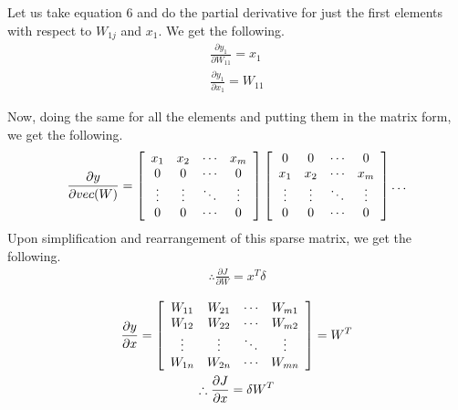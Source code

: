 \documentclass[a4paper]{article}
\begin{document}
Let us take equation 6 and do the partial derivative for just the first elements with respect to $W_{1j}$ and $x_{1}$. We get the following.
\begin{equation}
\begin{gathered}
    \frac { \partial y_{1} } { \partial W_{11} } = x_{1} \\
    \frac { \partial y_{1} } { \partial x_{1} } = W_{11}
\end{gathered}
\end{equation}

Now, doing the same for all the elements and putting them in the matrix form, we get the following.
\begin{equation}
\begin{gathered}
    \frac { \partial y } { \partial vec(W) } = \left[ \begin{array} { c c c c }
    {x_{1}} & {x_{2}} & {\cdots} & {x_{m}} \\
    {0} & {0} & {\cdots} & {0} \\
    {\vdots} & {\vdots} & {\ddots} & {\vdots} \\
    {0} & {0} & {\cdots} & {0}
    \end{array} \right]
    \left[ \begin{array} { c c c c }
    {0} & {0} & {\cdots} & {0} \\
    {x_{1}} & {x_{2}} & {\cdots} & {x_{m}} \\
    {\vdots} & {\vdots} & {\ddots} & {\vdots} \\
    {0} & {0} & {\cdots} & {0}
    \end{array} \right] \dots \\
\end{gathered}
\end{equation}
Upon simplification and rearrangement of this sparse matrix, we get the following.
\begin{equation}
\begin{gathered}
    \therefore \frac { \partial J } { \partial W } = x ^{T} \delta
\end{gathered}
\end{equation}

\begin{equation}
\begin{gathered}
    \frac { \partial y } { \partial x } = \left[ \begin{array} { c c c c }
    {W_{11}} & {W_{21}} & {\cdots} & {W_{m1}} \\
    {W_{12}} & {W_{22}} & {\cdots} & {W_{m2}} \\
    {\vdots} & {\vdots} & {\ddots} & {\vdots} \\
    {W_{1n}} & {W_{2n}} & {\cdots} & {W_{mn}}
    \end{array} \right] = W ^{T} \\
    \therefore \frac { \partial J } { \partial x } = \delta W ^{T}
\end{gathered}
\end{equation}
\end{document}
